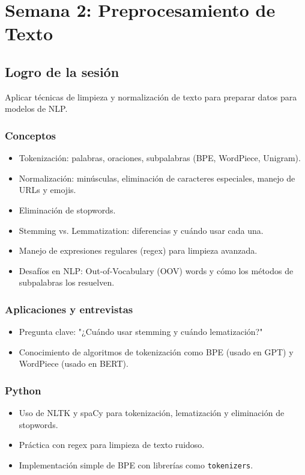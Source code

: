 \documentclass[12pt,a4paper,openany,oneside]{book}
\begin{document}
\chapter{Semana 2: Preprocesamiento de Texto}

\section{Logro de la sesión}
Aplicar técnicas de limpieza y normalización de texto para preparar datos para modelos de NLP.

\subsection{Conceptos}
\begin{itemize}
    \item Tokenización: palabras, oraciones, subpalabras (BPE, WordPiece, Unigram).
    \item Normalización: minúsculas, eliminación de caracteres especiales, manejo de URLs y emojis.
    \item Eliminación de stopwords.
    \item Stemming vs. Lemmatization: diferencias y cuándo usar cada una.
    \item Manejo de expresiones regulares (regex) para limpieza avanzada.
    \item Desafíos en NLP: Out-of-Vocabulary (OOV) words y cómo los métodos de subpalabras los resuelven.
\end{itemize}

\subsection{Aplicaciones y entrevistas}
\begin{itemize}
    \item Pregunta clave: "¿Cuándo usar stemming y cuándo lematización?"
    \item Conocimiento de algoritmos de tokenización como BPE (usado en GPT) y WordPiece (usado en BERT).
\end{itemize}

\subsection{Python}
\begin{itemize}
    \item Uso de NLTK y spaCy para tokenización, lematización y eliminación de stopwords.
    \item Práctica con regex para limpieza de texto ruidoso.
    \item Implementación simple de BPE con librerías como \texttt{tokenizers}.
\end{itemize}
\end{document}
